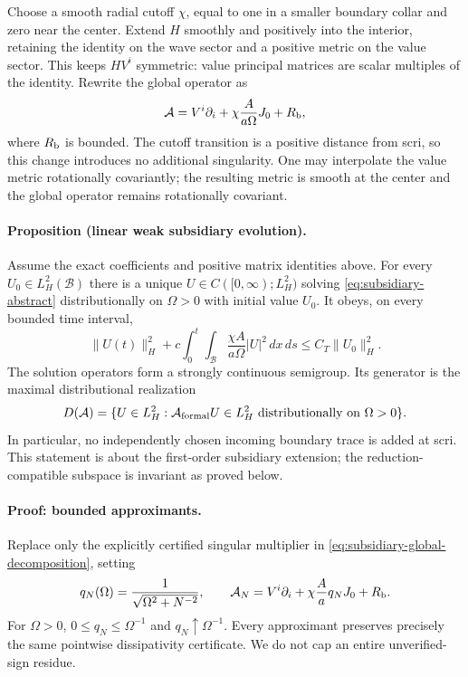 Choose a smooth radial cutoff $\chi$, equal to one in a smaller boundary
collar and zero near the center. Extend $H$ smoothly and positively into the
interior, retaining the identity on the wave sector and a positive metric on
the value sector. This keeps $HV^i$ symmetric: value principal matrices are
scalar multiples of the identity. Rewrite the global operator as
\begin{equation}
 \mathcal A=V^i\partial_i+
       \chi\frac{A}{a\Omega}J_0+R_{\rm b},
 \label{eq:subsidiary-global-decomposition}
\end{equation}
where $R_{\rm b}$ is bounded. The cutoff transition is a positive distance
from scri, so this change introduces no additional singularity. One may
interpolate the value metric rotationally covariantly; the resulting metric
is smooth at the center and the global operator remains rotationally
covariant.

\paragraph{Proposition (linear weak subsidiary evolution).}
Assume the exact coefficients and positive matrix identities above. For every
$U_0\in L^2_H(\mathcal B)$ there is a unique
$U\in C([0,\infty);L^2_H)$ solving
\eqref{eq:subsidiary-abstract} distributionally on $\Omega>0$ with initial
value $U_0$. It obeys, on every bounded time interval,
\begin{equation}
 \|U(t)\|_H^2+
 c\int_0^t\!\int_{\mathcal B}
      \frac{\chi A}{a\Omega}|U|^2\,dx\,ds
 \le C_T\|U_0\|_H^2 .
 \label{eq:subsidiary-weak-energy}
\end{equation}
The solution operators form a strongly continuous semigroup. Its generator
is the maximal distributional realization
\begin{equation}
 D(\mathcal A)=\{U\in L^2_H:
          \mathcal A_{\rm formal}U\in L^2_H
          \text{ distributionally on }\Omega>0\}.
 \label{eq:subsidiary-maximal-domain}
\end{equation}
In particular, no independently chosen incoming boundary trace is added at
scri. This statement is about the first-order subsidiary extension; the
reduction-compatible subspace is invariant as proved below.

\paragraph{Proof: bounded approximants.}
Replace only the explicitly certified singular multiplier in
\eqref{eq:subsidiary-global-decomposition}, setting
\[
 q_N(\Omega)=\frac{1}{\sqrt{\Omega^2+N^{-2}}},\qquad
 \mathcal A_N=V^i\partial_i+
          \chi\frac Aa q_NJ_0+R_{\rm b}.
\]
For $\Omega>0$, $0\le q_N\le\Omega^{-1}$ and $q_N\uparrow\Omega^{-1}$.
Every approximant preserves precisely the same pointwise dissipativity
certificate. We do not cap an entire unverified-sign residue.

